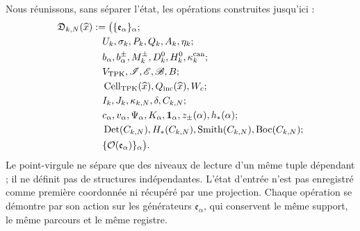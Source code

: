 Nous réunissons, sans séparer l'état, les opérations construites jusqu'ici :
\begin{equation}
\label{eq:pdfv2-cor-constructor-unico}
 \begin{aligned}
 \mathfrak D_{k,N}(\widehat x)
 &:=\bigl(\{\mathfrak e_\alpha\}_\alpha;\\
 &\quad U_k,\sigma_k,P_k,Q_k,A_k,\eta_k;\\
 &\quad b_\alpha,b_\alpha^\pm,M_k^\pm,D_k^0,H_k^0,
 \kappa_k^{\rm can};\\
 &\quad V_{\rm TPK},\mathscr I,\mathscr E,\mathscr B,B;\\
 &\quad \operatorname{Cell}_{\rm TPK}(\widehat x),Q_{\rm inc}(\widehat x),W_c;\\
 &\quad I_k,J_k,\kappa_{k,N},\delta,C_{k,N};\\
 &\quad c_\alpha,v_\alpha,\Psi_\alpha,K_\alpha,
 \mathbf1_\alpha,z_\pm(\alpha),h_*(\alpha);\\
 &\quad
 \operatorname{Det}(C_{k,N}),H_*(C_{k,N}),
 \operatorname{Smith}(C_{k,N}),\operatorname{Boc}(C_{k,N});\\
 &\quad \{\mathcal O(\mathfrak e_\alpha)\}_\alpha
 \bigr).
 \end{aligned}
\end{equation}
Le point-virgule ne sépare que des niveaux de lecture d'un même tuple dépendant ; il ne définit pas de structures indépendantes. L'état d'entrée n'est pas enregistré comme première coordonnée ni récupéré par une projection. Chaque opération se démontre par son action sur les générateurs \(\mathfrak e_\alpha\), qui conservent le même support, le même parcours et le même registre.


